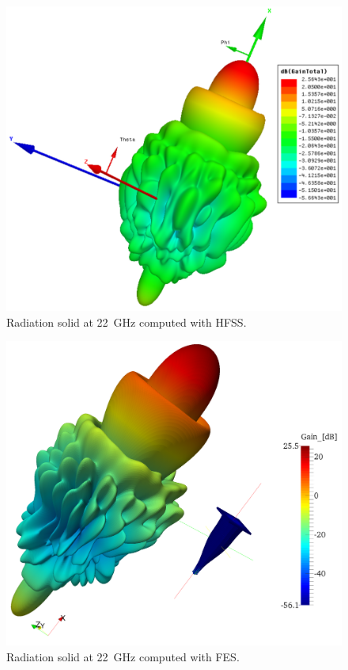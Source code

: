 \begin{figure}[h!]
\centering
\includegraphics[width=14.4cm]{CircHornRadHFSS}
\caption{Radiation solid at 22~GHz computed with HFSS.}
\label{fig:CircHornRadHFSS}
\end{figure}

\begin{figure}[h!]
\centering
\includegraphics[width=13.4cm]{CircHornRad}
\caption{Radiation solid at 22~GHz computed with FES.}
\label{fig:CircHornRad}
\end{figure}

